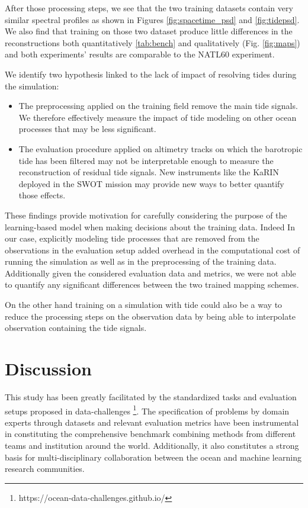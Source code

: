\begin{bibunit}
After those processing steps, we see that the two training datasets contain very similar spectral profiles as shown in Figures \ref{fig:spacetime_psd} and \ref{fig:tidepsd}. 
We also find that training on those two dataset produce little differences in the reconstructions both quantitatively \ref{tab:bench} and qualitatively (Fig. \ref{fig:maps}) and both experiments' results are comparable to the NATL60 experiment.
 
We identify two hypothesis linked to the lack of impact of resolving tides during the simulation:
\begin{itemize}
    \item The preprocessing applied on the training field remove the main tide signals. We therefore effectively measure the impact of tide modeling on other ocean processes that may be less significant.
    \item The evaluation procedure applied on altimetry tracks on which the barotropic tide has been filtered may not be interpretable enough to measure the reconstruction of residual tide signals. New instruments like the KaRIN deployed in the SWOT mission may provide new ways to better quantify those effects.   
\end{itemize}

These findings provide motivation for carefully considering the purpose of the learning-based model when making decisions about the training data. Indeed In our case, explicitly modeling tide processes that are removed from the observations in the evaluation setup added overhead in the computational cost of running the simulation as well as in the preprocessing of the training data. Additionally given the considered evaluation data and metrics, we were not able to quantify any significant differences between the two trained mapping schemes.

On the other hand training on a simulation with tide could also be a way to reduce the processing steps on the observation data by being able to interpolate observation containing the tide signals.

\section{Discussion}
\label{sec:discussion}
This study has been greatly facilitated by the standardized tasks and evaluation setups proposed in data-challenges \footnote{https://ocean-data-challenges.github.io/}. The specification of problems by domain experts through datasets and relevant evaluation metrics have been instrumental in constituting the comprehensive benchmark combining methods from different teams and institution around the world. Additionally, it also constitutes a strong basis for multi-disciplinary collaboration between the ocean and machine learning research communities.


\end{bibunit}
